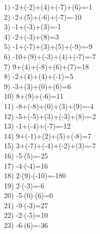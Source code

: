 \documentclass[a4paper,10pt]{article}
\begin{document}
1)   -2+(-2)+(4)+(-7)+(6)=-1
\vspace{0.5cm}\\2)   -2+(5)+(-6)+(-7)=-10
\vspace{0.5cm}\\3)   -1+(-3)+(3)=-1
\vspace{0.5cm}\\4)   -2+(-3)+(8)=3
\vspace{0.5cm}\\5)   -1+(-7)+(3)+(5)+(-9)=-9
\vspace{0.5cm}\\6)   -10+(9)+(-3)+(4)+(-7)=-7
\vspace{0.5cm}\\7)   9+(4)+(-8)+(6)+(7)=18
\vspace{0.5cm}\\8)   -2+(4)+(4)+(-1)=5
\vspace{0.5cm}\\9)   -3+(3)+(0)+(6)=6
\vspace{0.5cm}\\10)   8+(9)+(-6)=11
\vspace{0.5cm}\\11)   -8+(-8)+(0)+(3)+(9)=-4
\vspace{0.5cm}\\12)   -5+(-5)+(3)+(-3)+(8)=-2
\vspace{0.5cm}\\13)   -1+(-4)+(-7)=-12
\vspace{0.5cm}\\14)   9+(-1)+(2)+(5)+(-8)=7
\vspace{0.5cm}\\15)   3+(-7)+(-4)+(-2)+(3)=-7
\vspace{0.5cm}\\16)   -5$\cdot$(5)=-25
\vspace{0.5cm}\\17)   -4$\cdot$(-4)=16
\vspace{0.5cm}\\18)   2$\cdot$(9)$\cdot$(-10)=-180
\vspace{0.5cm}\\19)   2$\cdot$(-3)=-6
\vspace{0.5cm}\\20)   -5$\cdot$(0)$\cdot$(6)=0
\vspace{0.5cm}\\21)   -9$\cdot$(-3)=27
\vspace{0.5cm}\\22)   -2$\cdot$(-5)=10
\vspace{0.5cm}\\23)   -6$\cdot$(6)=-36
\end{document}
